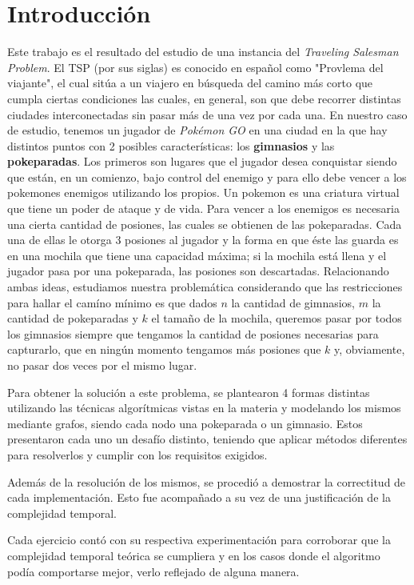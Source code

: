 \section{Introducción}

Este trabajo es el resultado del estudio de una instancia del \textit{Traveling Salesman Problem}. El TSP (por sus siglas) es conocido en español como "Provlema del viajante", el cual sitúa a un viajero en búsqueda del camino más corto que cumpla ciertas condiciones las cuales, en general, son que debe recorrer distintas ciudades interconectadas sin pasar más de una vez por cada una. En nuestro caso de estudio, tenemos un jugador de \textit{Pokémon GO} en una ciudad en la que hay distintos puntos con 2 posibles características: los \textbf{gimnasios} y las \textbf{pokeparadas}. Los primeros son lugares que el jugador desea conquistar siendo que están, en un comienzo, bajo control del enemigo y para ello debe vencer a los pokemones enemigos utilizando los propios. Un pokemon es una criatura virtual que tiene un poder de ataque y de vida. Para vencer a los enemigos es necesaria una cierta cantidad de posiones, las cuales se obtienen de las pokeparadas. Cada una de ellas le otorga 3 posiones al jugador y la forma en que éste las guarda es en una mochila que tiene una capacidad máxima; si la mochila está llena y el jugador pasa por una pokeparada, las posiones son descartadas. Relacionando ambas ideas, estudiamos nuestra problemática considerando que las restricciones para hallar el camíno mínimo es que dados $n$ la cantidad de gimnasios, $m$ la cantidad de pokeparadas y $k$ el tamaño de la mochila, queremos pasar por todos los gimnasios siempre que tengamos la cantidad de posiones necesarias para capturarlo, que en ningún momento tengamos más posiones que $k$ y, obviamente, no pasar dos veces por el mismo lugar.

Para obtener la solución a este problema, se plantearon 4 formas distintas utilizando las técnicas algorítmicas vistas en la materia y modelando los mismos mediante grafos, siendo cada nodo una pokeparada o un gimnasio. Estos presentaron cada uno un desafío distinto, teniendo que aplicar métodos diferentes para resolverlos y cumplir con los requisitos exigidos.

Además de la resolución de los mismos, se procedió a demostrar la correctitud de
cada implementación. Esto fue acompañado a su vez de una justificación de la
complejidad temporal.

Cada ejercicio contó con su respectiva experimentación para corroborar que la
complejidad temporal teórica se cumpliera y en los casos donde el algoritmo
podía comportarse mejor, verlo reflejado de alguna manera.

